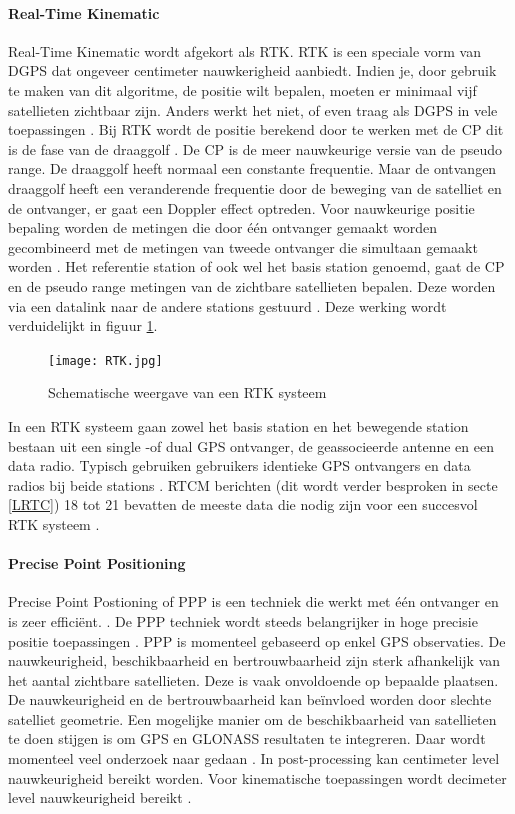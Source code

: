\paragraph{Real-Time Kinematic}
Real-Time Kinematic wordt afgekort als RTK. RTK is een speciale vorm van DGPS dat ongeveer centimeter nauwkerigheid aanbiedt. Indien je, door gebruik te maken van dit algoritme, de positie wilt bepalen, moeten er minimaal vijf satellieten zichtbaar zijn. Anders werkt het niet, of even traag als DGPS in vele toepassingen \cite{LBibRTK}. Bij RTK wordt de positie berekend door te werken met de CP dit is de fase van de draaggolf \cite{LBibRTK2}. De CP is de meer nauwkeurige versie van de pseudo range. De draaggolf heeft normaal een constante frequentie. Maar de ontvangen draaggolf heeft een veranderende frequentie door de beweging van de satelliet en de ontvanger, er gaat een Doppler effect optreden. Voor nauwkeurige positie bepaling worden de metingen die door \'e\'en ontvanger gemaakt worden gecombineerd met de metingen van tweede ontvanger die simultaan gemaakt worden \cite{LBibRTK3}. Het referentie station of ook wel het basis station genoemd, gaat de CP en de pseudo range metingen van de zichtbare satellieten bepalen. Deze worden via een datalink naar de andere stations gestuurd \cite{LBibDGPS}. Deze werking wordt verduidelijkt in figuur \ref{imgRTK}. 

\begin{figure}[hpb]
	\texttt{[image: RTK.jpg]}
	\caption{Schematische weergave van een RTK systeem \cite{LBibDGPS}}
	\label{imgRTK}
\end{figure}

In een RTK systeem gaan zowel het basis station en het bewegende station bestaan uit een single -of dual GPS ontvanger, de geassocieerde antenne en een data radio. Typisch gebruiken gebruikers identieke GPS ontvangers en data radios bij beide stations \cite{LBibRTK3}. RTCM berichten (dit wordt verder besproken in secte \ref{LRTC}) 18 tot 21 bevatten de meeste data die nodig zijn voor een succesvol RTK systeem \cite{LBibDGPS} .


\paragraph{Precise Point Positioning}
Precise Point Postioning of PPP is een techniek die werkt met \'e\'en ontvanger en is zeer effici\"ent. \cite{LBibGNSS4}. De PPP techniek wordt steeds belangrijker in hoge precisie positie toepassingen \cite{LBibPPP2}. PPP is momenteel gebaseerd op enkel GPS observaties. De nauwkeurigheid, beschikbaarheid en bertrouwbaarheid zijn sterk afhankelijk van het aantal zichtbare satellieten. Deze is vaak onvoldoende op bepaalde plaatsen. De nauwkeurigheid en de bertrouwbaarheid kan be\"invloed worden door slechte satelliet geometrie. Een mogelijke manier om de beschikbaarheid van satellieten te doen stijgen is om GPS en GLONASS resultaten te integreren. Daar wordt momenteel veel onderzoek naar gedaan \cite{LBibPPP}. In post-processing kan centimeter level nauwkeurigheid bereikt worden. Voor kinematische toepassingen wordt decimeter level nauwkeurigheid bereikt \cite{LBibGPS2}.  

